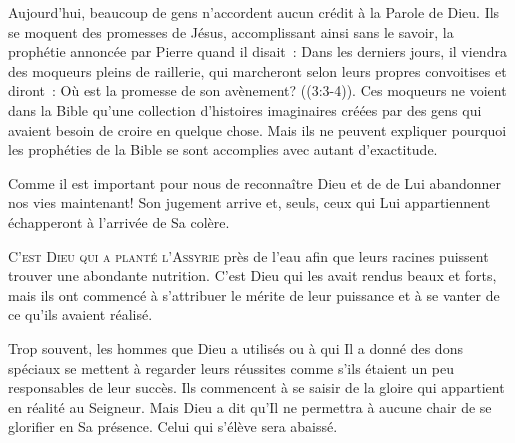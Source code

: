 
Aujourd'hui, beaucoup de gens n'accordent aucun crédit à la Parole de Dieu.
 Ils se moquent des promesses de Jésus, accomplissant ainsi sans le savoir,
 la prophétie annoncée par Pierre quand il disait~: 
 \og Dans les derniers jours, il viendra des moqueurs pleins de raillerie,
 qui marcheront selon leurs propres convoitises et diront~:
 Où est la promesse de son avènement? \fg{}
 ((3:3-4)).
 Ces moqueurs ne voient dans la Bible qu'une collection d'histoires imaginaires
 créées par des gens qui avaient besoin de croire en quelque chose.
 Mais ils ne peuvent expliquer pourquoi les prophéties de la Bible
 se sont accomplies avec autant d'exactitude. 

Comme il est important pour nous de reconnaître Dieu et de de Lui abandonner
 nos vies maintenant! Son jugement arrive et, seuls, ceux qui Lui appartiennent
 échapperont à l'arrivée de Sa colère. 

\dvrule






\lettrine{C}{'est Dieu qui a \og planté \fg{} l'Assyrie}
 près de l'eau afin que leurs racines puissent trouver une abondante nutrition.
 C'est Dieu qui les avait rendus beaux et forts,
 mais ils ont commencé à s'attribuer le mérite de leur puissance
 et à se vanter de ce qu'ils avaient réalisé.


Trop souvent, les hommes que Dieu a utilisés ou à qui Il a donné des dons
 spéciaux se mettent à regarder leurs réussites comme s'ils étaient
 un peu responsables de leur succès.
 Ils commencent à se saisir de la gloire qui appartient en réalité au Seigneur.
 Mais Dieu a dit qu'Il ne permettra à aucune chair de se glorifier
 en Sa présence. Celui qui s'élève sera abaissé.

